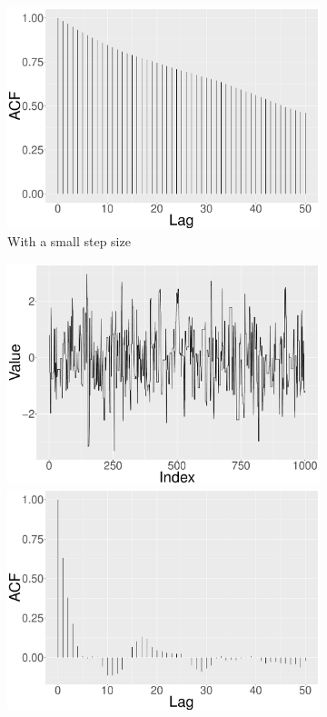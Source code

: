 \begin{figure}[h]
\begin{subfigure}[b]{0.32\textwidth}
    \includegraphics[width=\textwidth]{Chapters/05MCMCOU/plots/ggsmallacf_Final.pdf}
    \caption{With a small step size}\label{MCMCsmallstep}
\end{subfigure}
\begin{subfigure}[b]{0.32\textwidth}
    \includegraphics[width=\textwidth]{Chapters/05MCMCOU/plots/ggbestchain_Final.pdf}
    \includegraphics[width=\textwidth]{Chapters/05MCMCOU/plots/ggbestacf_Final.pdf}

\end{subfigure}
\end{figure}
